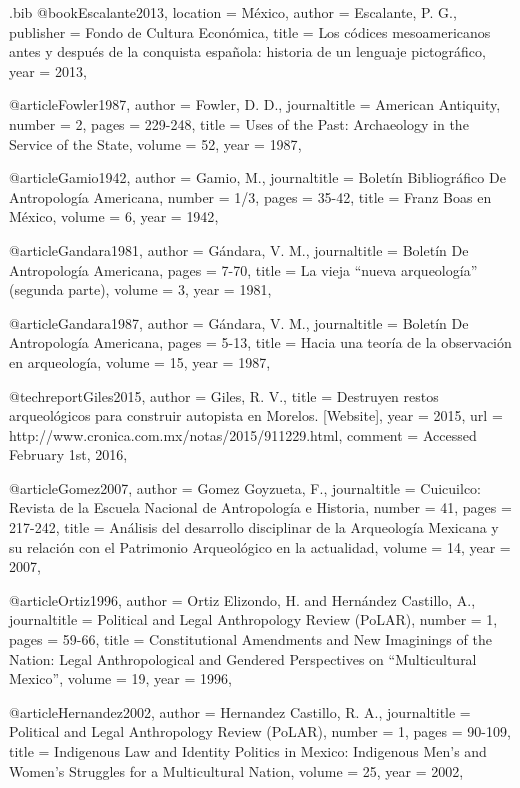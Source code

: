 \begin{filecontents}{\IJSRAidentifier.bib}
@book{Escalante2013,
location =  {México},
author = {Escalante, P. G.},
publisher = {Fondo de Cultura Económica},
title = {Los códices mesoamericanos antes y después de la conquista española: historia de un lenguaje pictográfico},
year = {2013},
}


@article{Fowler1987,
author = {Fowler, D. D.},
journaltitle =  {American Antiquity},
number = {2},
pages = {229-248},
title = {Uses of the Past: Archaeology in the Service of the State},
volume = {52},
year = {1987},
}


@article{Gamio1942,
author = {Gamio, M.},
journaltitle =  {Boletín Bibliográfico De Antropología Americana},
number = {1/3},
pages = {35-42},
title = {Franz Boas en México},
volume = {6},
year = {1942},
}


@article{Gandara1981,
author = {Gándara, V. M.},
journaltitle =  {Boletín De Antropología Americana},
pages = {7-70},
title = {La vieja \enquote{nueva arqueología} (segunda parte)},
volume = {3},
year = {1981},
}


@article{Gandara1987,
author = {Gándara, V. M.},
journaltitle =  {Boletín De Antropología Americana},
pages = {5-13},
title = {Hacia una teoría de la observación en arqueología},
volume = {15},
year = {1987},
}


@techreport{Giles2015,
author = {Giles, R. V.},
title = {Destruyen restos arqueológicos para construir autopista en Morelos. [Website]},
year = {2015},
url = {http://www.cronica.com.mx/notas/2015/911229.html},
comment = {Accessed February 1st, 2016},
}


@article{Gomez2007,
author = {Gomez Goyzueta, F.},
journaltitle =  {Cuicuilco: Revista de la Escuela Nacional de Antropología e Historia},
number = {41},
pages = {217-242},
title = {Análisis del desarrollo disciplinar de la Arqueología Mexicana y su relación con el Patrimonio Arqueológico en la actualidad},
volume = {14},
year = {2007},
}


@article{Ortiz1996,
author = {Ortiz Elizondo, H. and Hernández Castillo, A.},
journaltitle =  {Political and Legal Anthropology Review (PoLAR)},
number = {1},
pages = {59-66},
title = {Constitutional Amendments and New Imaginings of the Nation: Legal Anthropological and Gendered Perspectives on \enquote{Multicultural Mexico}},
volume = {19},
year = {1996},
}


@article{Hernandez2002,
author = {Hernandez Castillo, R. A.},
journaltitle =  {Political and Legal Anthropology Review (PoLAR)},
number = {1},
pages = {90-109},
title = {Indigenous Law and Identity Politics in Mexico: Indigenous Men's and Women's Struggles for a Multicultural Nation},
volume = {25},
year = {2002},
}



\end{filecontents}
